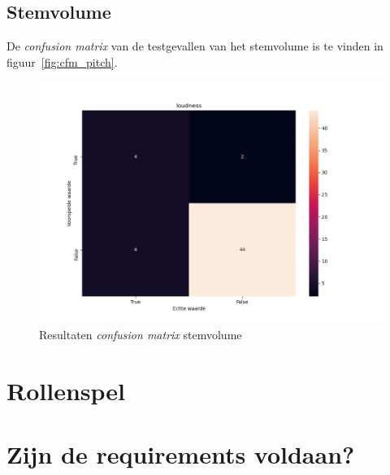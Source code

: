 \subsection{Stemvolume}

De \textit{confusion matrix} van de testgevallen van het stemvolume is te vinden in figuur~\ref{fig:cfm_pitch}.
\begin{figure}
    \centering
    \includegraphics[width=1\textwidth]{./img/cfm_loudness}
    \caption{\label{fig:cfm_loudness} Resultaten \textit{confusion matrix} stemvolume}
\end{figure}


\section{Rollenspel}

\section{Zijn de requirements voldaan?}
